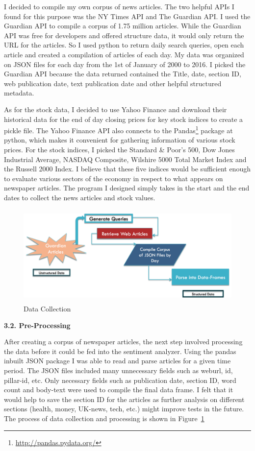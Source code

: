 \documentclass{acm_proc_article-sp}
\begin{document}
I decided to compile my own corpus of news articles. The two helpful APIs I found for this purpose was the NY Times API and The Guardian API. I used the Guardian API to compile a corpus of 1.75 million articles. While the Guardian API was free for developers and offered structure data, it would only return the URL for the articles. So I used python to return daily search queries, open each article and created a compilation of articles of each day. My data was organized on JSON files for each day from the 1st of January of 2000 to 2016. I picked the Guardian API because the data returned contained the Title, date, section ID, web publication date, text publication date and other helpful structured metadata.  

As for the stock data, I decided to use Yahoo Finance and download their historical data for the end of day closing prices for key stock indices to create a pickle file. The Yahoo Finance API also connects to the Pandas\footnote{\url{http://pandas.pydata.org/}} package at python, which makes it convenient for gathering information of various stock prices. For the stock indices, I picked the Standard & Poor's 500, Dow Jones Industrial Average, NASDAQ Composite, Wilshire 5000 Total Market Index and the Russell 2000 Index. I believe that these five indices would be sufficient enough to evaluate various sectors of the economy in respect to what appears on newspaper articles. The program I designed simply takes in the start and the end dates to collect the news articles and stock values.




\begin{figure}[htp]
\centering
\includegraphics[width=\linewidth, height=5cm]{figures/Data.png}
\caption{Data Collection}
\label{fig:datacoll}
\end{figure}




\textbf{3.2. Pre-Processing }

After creating a corpus of newspaper articles, the next step involved processing the data before it could be fed into the sentiment analyzer. Using the pandas inbuilt JSON package I was able to read and parse articles for a given time period. The JSON files included many unnecessary fields such as weburl, id, pillar-id, etc. Only necessary fields such as publication date, section ID, word count and body-text were used to compile the final data frame. I felt that it would help to save the section ID for the articles as further analysis on different sections (health, money, UK-news, tech, etc.) might improve tests in the future. The process of data collection and processing is shown in  Figure~\ref{fig:datacoll}  
\end{document}
